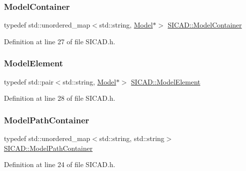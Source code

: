 \subsubsection{\texorpdfstring{Model\+Container}{ModelContainer}}
{\footnotesize\ttfamily typedef std\+::unordered\+\_\+map$<$std\+::string, \mbox{\hyperlink{classModel}{Model}}$\ast$$>$ \mbox{\hyperlink{classSICAD_aca3c9693d298f2e8dc171194c6a7507c}{S\+I\+C\+A\+D\+::\+Model\+Container}}}



Definition at line 27 of file S\+I\+C\+A\+D.\+h.

\mbox{\label{classSICAD_af999665097d7cdf11780735bf24a6956}} 
\subsubsection{\texorpdfstring{Model\+Element}{ModelElement}}
{\footnotesize\ttfamily typedef std\+::pair$<$std\+::string, \mbox{\hyperlink{classModel}{Model}}$\ast$$>$ \mbox{\hyperlink{classSICAD_af999665097d7cdf11780735bf24a6956}{S\+I\+C\+A\+D\+::\+Model\+Element}}}



Definition at line 28 of file S\+I\+C\+A\+D.\+h.

\mbox{\label{classSICAD_a9e1e1460d4c0f331b4fd015aae4dd721}} 
\subsubsection{\texorpdfstring{Model\+Path\+Container}{ModelPathContainer}}
{\footnotesize\ttfamily typedef std\+::unordered\+\_\+map$<$std\+::string, std\+::string$>$ \mbox{\hyperlink{classSICAD_a9e1e1460d4c0f331b4fd015aae4dd721}{S\+I\+C\+A\+D\+::\+Model\+Path\+Container}}}



Definition at line 24 of file S\+I\+C\+A\+D.\+h.

\mbox{\label{classSICAD_a5148c8a96c82625706ce2e5b86b52dd7}} 
